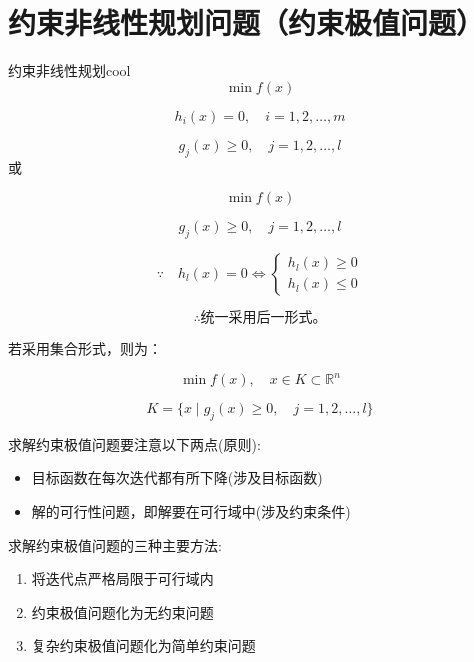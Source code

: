 \section{约束非线性规划问题（约束极值问题）}
\begin{thmbox}{约束非线性规划}{cool}
\[
\min f(x)
\]

\[
h_i(x) = 0, \quad i = 1, 2, \dots, m
\]

\[
g_j(x) \geq 0, \quad j = 1, 2, \dots, l
\]
或

\[
\min f(x)
\]

\[
g_j(x) \geq 0, \quad j = 1, 2, \dots, l
\]

\[\because
\quad h_l(x) = 0 \iff
\begin{cases}
h_l(x) \geq 0 \\
h_l(x) \leq 0
\end{cases}
\]

\[\therefore
\text{统一采用后一形式。}
\]

若采用集合形式，则为：

\[
\min f(x), \quad x \in K \subset \mathbb{R}^n
\]

\[
K = \{x \mid g_j(x) \geq 0, \quad j = 1, 2, \dots, l\}
\]
\end{thmbox}
求解约束极值问题要注意以下两点(原则):
\begin{itemize}
    \item 目标函数在每次迭代都有所下降(涉及目标函数)
    \item 解的可行性问题，即解要在可行域中(涉及约束条件)
\end{itemize}
求解约束极值问题的三种主要方法:
\begin{enumerate}
    \item 将迭代点严格局限于可行域内
    \item 约束极值问题化为无约束问题
    \item 复杂约束极值问题化为简单约束问题
\end{enumerate}
